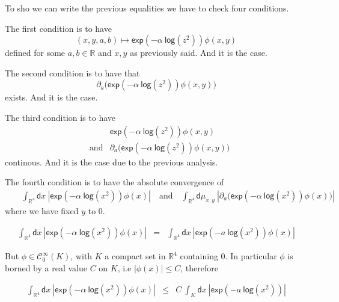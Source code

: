 \documentclass[10pt]{book}
\newcommand{\abs}[1]{\left|#1\right|}
\let\int\int
\theoremstyle{break}
\begin{document}
\bigskip


To sho we can write the previous equalities we have to check four conditions.


The first condition is to have
\begin{equation*}
(x,y,a,b) \mapsto \mathsf{exp}\left(-\alpha \ \mathsf{log}(z^2)\right) \phi(x,y)
\end{equation*}
defined for some $a,b \in \mathbb{R}$ and $x, y$ as previously said. And it is the case.


The second condition is to have that
\begin{equation*}
\partial_a \bigg(\mathsf{exp}\left(-\alpha \ \mathsf{log}(z^2)\right) \phi(x,y)\bigg)
\end{equation*}
exists. And it is the case.


The third condition is to have 
\begin{eqnarray*}
&& \mathsf{exp}\left(-\alpha \ \mathsf{log}(z^2)\right) \phi(x,y) \\
&\mbox{and}& \partial_a \bigg(\mathsf{exp}\left(-\alpha \ \mathsf{log}(z^2)\right) \phi(x,y)\bigg)
\end{eqnarray*}
continous. And it is the case due to the previous analysis.


The fourth condition is to have the absolute convergence of
\begin{eqnarray*}
&& \int_{\mathbb{R}^4} \mathsf{d}x \ \abs{\mathsf{exp}\left(-\alpha \ \mathsf{log}(x^2)\right) \phi(x)} 
\quad \mbox{and} \quad 
\int_{\mathbb{R}^4} \mathsf{d}\mu_{x,y} \ \abs{\partial_a \bigg(\mathsf{exp}\left(-\alpha \ \mathsf{log}(x^2)\right) \phi(x)\bigg)}
\end{eqnarray*}
where we have fixed $y$ to $0$.

\begin{eqnarray*}
\int_{\mathbb{R}^4} \mathsf{d}x \ \abs{\mathsf{exp}\left(-\alpha \ \mathsf{log}(x^2)\right) \phi(x)} 
&=& 
\int_{\mathbb{R}^4} \mathsf{d}x \ \abs{\mathsf{exp}\left(- a \ \mathsf{log}(x^2)\right) \phi(x)}  \end{eqnarray*}


But $\phi \in \mathcal{C}^\infty_0(K)$, with $K$ a compact set in $\mathbb{R}^4$ containing $0$. In particular $\phi$ is borned by a real value $C$ on $K$, i.e $\abs{\phi(x)} \leq C$, therefore

\begin{eqnarray*}
\int_{\mathbb{R}^4} \mathsf{d}x \ \abs{\mathsf{exp}\left(-\alpha \ \mathsf{log}(x^2)\right) \phi(x)} 
&\leq& 
C \ \int_{K} \mathsf{d}x \ \abs{\mathsf{exp}\left(- a \ \mathsf{log}(x^2)\right)}  
\end{eqnarray*}
\end{document}

